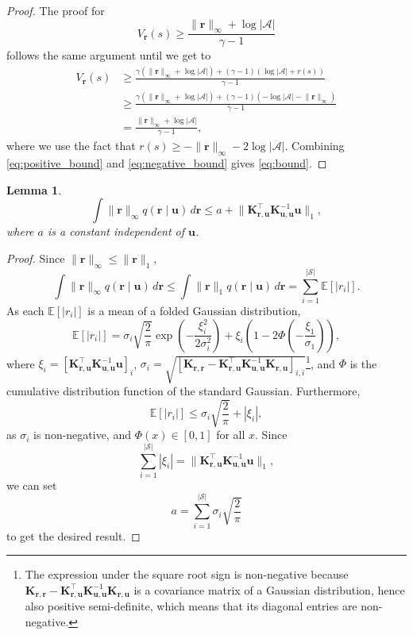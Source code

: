 \documentclass{mpaper}
\newtheorem{lemma}[theorem]{Lemma}
\newcommand{\V}{V_{\mathbf{r}}}
\newcommand{\rinf}{\lVert \mathbf{r} \rVert_\infty}
\newcommand{\Kuu}{\mathbf{K}_{\mathbf{u},\mathbf{u}}}
\newcommand{\Krr}{\mathbf{K}_{\mathbf{r},\mathbf{r}}}
\newcommand{\Kru}{\mathbf{K}_{\mathbf{r},\mathbf{u}}}
\begin{document}
\begin{proof}
  The proof for
  \begin{equation} \label{eq:negative_bound}
    \V(s) \ge \frac{\rinf + \log|\mathcal{A}|}{\gamma - 1}
  \end{equation}
  follows the same argument until we get to
  \begin{align*}
    \V(s) &\ge \frac{\gamma(\rinf + \log|\mathcal{A}|) + (\gamma - 1)(\log|\mathcal{A}| + r(s))}{\gamma - 1} \\
          &\ge \frac{\gamma(\rinf + \log|\mathcal{A}|) + (\gamma - 1)(-\log|\mathcal{A}| -\rinf)}{\gamma - 1} \\
          &= \frac{\rinf + \log|\mathcal{A}|}{\gamma - 1},
  \end{align*}
  where we use the fact that $r(s) \ge -\rinf - 2\log|\mathcal{A}|$. Combining
  \eqref{eq:positive_bound} and \eqref{eq:negative_bound} gives
  \eqref{eq:bound}.
\end{proof}

\begin{lemma} \label{lemma:integral_of_r}
  \[
    \int \lVert \mathbf{r} \rVert_\infty q(\mathbf{r} \mid \mathbf{u})\,d\mathbf{r} \le a +
    \lVert \Kru^\intercal \Kuu^{-1} \mathbf{u} \rVert_1,
  \]
  where $a$ is a constant independent of $\mathbf{u}$.
\end{lemma}
\begin{proof}
  Since $\rinf \le \lVert \mathbf{r} \rVert_1$,
  \[
    \int \lVert \mathbf{r} \rVert_\infty q(\mathbf{r} \mid \mathbf{u})\,d\mathbf{r} \le \int
    \lVert \mathbf{r} \rVert_1 q(\mathbf{r} \mid \mathbf{u})\,d\mathbf{r} =
    \sum_{i=1}^{|\mathcal{S}|} \mathbb{E}[|r_i|].
  \]
  As each $\mathbb{E}[|r_i|]$ is a mean of a folded Gaussian distribution,
  \[
    \mathbb{E}[|r_i|] = \sigma_i \sqrt{\frac{2}{\pi}} \exp
    \left(-\frac{\xi_i^2}{2\sigma_i^2} \right) + \xi_i \left( 1 - 2\Phi \left(
        -\frac{\xi_1}{\sigma_1} \right) \right),
  \]
  where $\xi_i = \left[\Kru^\intercal\Kuu^{-1}\mathbf{u}\right]_i$, $\sigma_i =
  \sqrt{[\Krr - \Kru^\intercal\Kuu^{-1}\Kru]_{i,i}}$\footnote{The expression
    under the square root sign is non-negative because $\Krr -
    \Kru^\intercal\Kuu^{-1}\Kru$ is a covariance matrix of a Gaussian
    distribution, hence also positive semi-definite, which means that its
    diagonal entries are non-negative.}, and $\Phi$ is the cumulative
  distribution function of the standard Gaussian. Furthermore,
  \[
    \mathbb{E}[|r_i|] \le \sigma_i\sqrt{\frac{2}{\pi}} + |\xi_i|,
  \]
  as $\sigma_i$ is non-negative, and $\Phi(x) \in [0, 1]$ for all $x$. Since
  \[ \sum_{i=1}^{|\mathcal{S}|} |\xi_i| = \lVert \Kru^\intercal \Kuu^{-1}
    \mathbf{u} \rVert_1, \]
  we can set
  \[ a = \sum_{i=1}^{|\mathcal{S}|} \sigma_i \sqrt{\frac{2}{\pi}} \]
  to get the desired result.
\end{proof}
\end{document}

